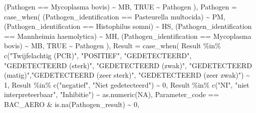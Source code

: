 \documentclass[
]{article}
\newenvironment{Shaded}{\begin{snugshade}}{\end{snugshade}}
\newcommand{\AttributeTok}[1]{\textcolor[rgb]{0.77,0.63,0.00}{#1}}
\newcommand{\ConstantTok}[1]{\textcolor[rgb]{0.00,0.00,0.00}{#1}}
\newcommand{\DecValTok}[1]{\textcolor[rgb]{0.00,0.00,0.81}{#1}}
\newcommand{\FunctionTok}[1]{\textcolor[rgb]{0.00,0.00,0.00}{#1}}
\newcommand{\NormalTok}[1]{#1}
\newcommand{\SpecialCharTok}[1]{\textcolor[rgb]{0.00,0.00,0.00}{#1}}
\newcommand{\StringTok}[1]{\textcolor[rgb]{0.31,0.60,0.02}{#1}}
\begin{document}
\begin{Shaded}
\begin{Highlighting}[]
\NormalTok{      (Pathogen }\SpecialCharTok{==} \StringTok{\textquotesingle{}Mycoplasma bovis\textquotesingle{}}\NormalTok{) }\SpecialCharTok{\textasciitilde{}} \StringTok{\textquotesingle{}MB\textquotesingle{}}\NormalTok{,}
      \ConstantTok{TRUE} \SpecialCharTok{\textasciitilde{}}\NormalTok{ Pathogen}
\NormalTok{    ),}
    \AttributeTok{Pathogen =} \FunctionTok{case\_when}\NormalTok{(}
\NormalTok{      (Pathogen\_identification }\SpecialCharTok{==} \StringTok{\textquotesingle{}Pasteurella multocida\textquotesingle{}}\NormalTok{) }\SpecialCharTok{\textasciitilde{}} \StringTok{\textquotesingle{}PM\textquotesingle{}}\NormalTok{,}
\NormalTok{      (Pathogen\_identification }\SpecialCharTok{==} \StringTok{\textquotesingle{}Histophilus somni\textquotesingle{}}\NormalTok{) }\SpecialCharTok{\textasciitilde{}} \StringTok{\textquotesingle{}HS\textquotesingle{}}\NormalTok{,}
\NormalTok{      (Pathogen\_identification }\SpecialCharTok{==} \StringTok{\textquotesingle{}Mannheimia haemolytica\textquotesingle{}}\NormalTok{) }\SpecialCharTok{\textasciitilde{}} \StringTok{\textquotesingle{}MH\textquotesingle{}}\NormalTok{,}
\NormalTok{      (Pathogen\_identification }\SpecialCharTok{==} \StringTok{\textquotesingle{}Mycoplasma bovis\textquotesingle{}}\NormalTok{) }\SpecialCharTok{\textasciitilde{}} \StringTok{\textquotesingle{}MB\textquotesingle{}}\NormalTok{,}
      \ConstantTok{TRUE} \SpecialCharTok{\textasciitilde{}}\NormalTok{ Pathogen}
\NormalTok{    ),}
      \AttributeTok{Result =} \FunctionTok{case\_when}\NormalTok{(}
\NormalTok{        Result }\SpecialCharTok{\%in\%} \FunctionTok{c}\NormalTok{(}\StringTok{"Twijfelachtig (PCR)"}\NormalTok{, }\StringTok{"POSITIEF"}\NormalTok{, }\StringTok{"GEDETECTEERD"}\NormalTok{, }\StringTok{"GEDETECTEERD (sterk)"}\NormalTok{, }\StringTok{"GEDETECTEERD (zwak)"}\NormalTok{,}
        \StringTok{"GEDETECTEERD (matig)"}\NormalTok{,}\StringTok{"GEDETECTEERD (zeer sterk)"}\NormalTok{, }\StringTok{"GEDETECTEERD (zeer zwak)"}\NormalTok{) }\SpecialCharTok{\textasciitilde{}} \DecValTok{1}\NormalTok{,}
\NormalTok{        Result }\SpecialCharTok{\%in\%} \FunctionTok{c}\NormalTok{(}\StringTok{"negatief"}\NormalTok{, }\StringTok{"Niet gedetecteerd"}\NormalTok{) }\SpecialCharTok{\textasciitilde{}} \DecValTok{0}\NormalTok{,}
\NormalTok{        Result }\SpecialCharTok{\%in\%} \FunctionTok{c}\NormalTok{(}\StringTok{"NI"}\NormalTok{, }\StringTok{"niet interpreteerbaar"}\NormalTok{, }\StringTok{"Inhibitie"}\NormalTok{) }\SpecialCharTok{\textasciitilde{}} \FunctionTok{as.numeric}\NormalTok{(}\ConstantTok{NA}\NormalTok{),}
\NormalTok{      Parameter\_code }\SpecialCharTok{==} \StringTok{\textquotesingle{}BAC\_AERO\textquotesingle{}} \SpecialCharTok{\&} \FunctionTok{is.na}\NormalTok{(Pathogen\_result) }\SpecialCharTok{\textasciitilde{}} \DecValTok{0}\NormalTok{,}

\end{Highlighting}
\end{Shaded}
\end{document}
